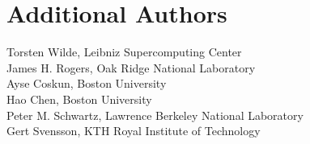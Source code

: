 \section {Additional Authors}
Torsten Wilde, Leibniz Supercomputing Center\\
James H. Rogers, Oak Ridge National Laboratory\\
Ayse Coskun, Boston University\\
Hao Chen, Boston University\\
Peter M. Schwartz, Lawrence Berkeley National Laboratory\\
Gert Svensson, KTH Royal Institute of Technology
